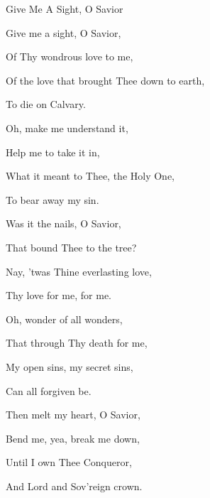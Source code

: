 \documentclass[12pt]{book}
\begin{document}
\begin{song}{Give Me A Sight, O Savior}{}
  {\SBPubDom}
  {}
  {}
  {}

  \begin{SBVerse}
    Give me a sight, O Savior,

    Of Thy wondrous love to me,

    Of the love that brought Thee down to earth,

    To die on Calvary.
  \end{SBVerse}

  \begin{SBOpGroup}
    Oh, make me understand it,

    Help me to take it in,

    What it meant to Thee, the Holy One,

    To bear away my sin.
  \end{SBOpGroup}

  \begin{SBVerse}
    Was it the nails, O Savior,

    That bound Thee to the tree?

    Nay, 'twas Thine everlasting love,

    Thy love for me, for me.
  \end{SBVerse}

  \begin{SBVerse}
    Oh, wonder of all wonders,

    That through Thy death for me,

    My open sins, my secret sins,

    Can all forgiven be.
  \end{SBVerse}

  \begin{SBVerse}
    Then melt my heart, O Savior,

    Bend me, yea, break me down,

    Until I own Thee Conqueror,

    And Lord and Sov'reign crown.
  \end{SBVerse}
\end{song}
\end{document}
